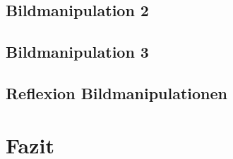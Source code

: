 \documentclass[11pt]{article}
\begin{document}
    \subsection{Bildmanipulation 2}

    \subsection{Bildmanipulation 3}

    \subsection{Reflexion Bildmanipulationen}

    \section{Fazit}
\end{document}
